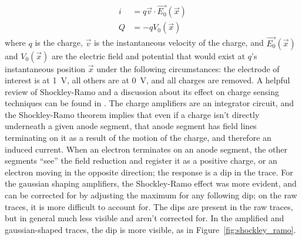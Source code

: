 \begin{equation}
\begin{split}
i &= q\vec{v} \cdot \vec{E_{0}}(\vec{x}) \\
Q &= -q V_{0}(\vec{x})
\end{split}
\end{equation}
where $q$ is the charge, $\vec{v}$ is the instantaneous velocity of the charge, and $\vec{E_{0}}(\vec{x})$ and $V_{0}(\vec{x})$ are the electric field and potential that would exist at $q$'s instantaneous position $\vec{x}$ under the following circumstances: the electrode of interest is at 1~V, all others are at 0~V, and all charges are removed. A helpful review of Shockley-Ramo and a discussion about its effect on charge sensing techniques can be found in \cite{He2001}. The charge amplifiers are an integrator circuit, and the Shockley-Ramo theorem implies that even if a charge isn't directly underneath a given anode segment, that anode segment has field lines terminating on it as a result of the motion of the charge, and therefore an induced current. When an electron terminates on an anode segment, the other segments ``see'' the field reduction and register it as a positive charge, or an electron moving in the opposite direction; the response is a dip in the trace. For the gaussian shaping amplifiers, the Shockley-Ramo effect was more evident, and can be corrected for by adjusting the maximum for any following dip; on the raw traces, it is more difficult to account for. The dips are present in the raw traces, but in general much less visible and aren't corrected for. In the amplified and gaussian-shaped traces, the dip is more visible, as in Figure~\ref{fig:shockley_ramo}.  

